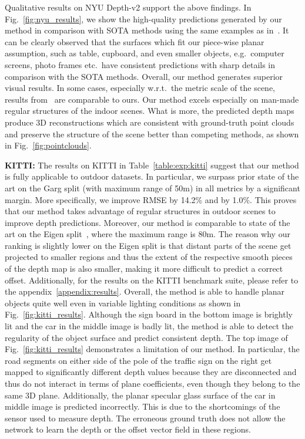\documentclass[final]{cvpr}
\begin{document}
Qualitative results on NYU Depth-v2 support the above findings. In Fig.~\ref{fig:nyu_results}, we show the high-quality predictions generated by our method in comparison with SOTA methods using the same examples as in~\cite{virtual:normal:depth}. It can be clearly observed that the surfaces which fit our piece-wise planar assumption, such as table, cupboard, and even smaller objects, e.g.\ computer screens, photo frames etc.\ have consistent predictions with sharp details in comparison with the SOTA methods. Overall, our method generates superior visual results. In some cases, especially w.r.t.\ the metric scale of the scene, results from~\cite{local:planar:guidance} are comparable to ours. Our method excels especially on man-made regular structures of the indoor scenes. What is more, the predicted depth maps produce 3D reconstructions which are consistent with ground-truth point clouds and preserve the structure of the scene better than competing methods, as shown in Fig.~\ref{fig:pointclouds}.

\textbf{KITTI:} The results on KITTI in Table~\ref{table:exp:kitti} suggest that our method is fully applicable to outdoor datasets. In particular, we surpass prior state of the art on the Garg split (with maximum range of 50m) in all metrics by a significant margin. More specifically, we improve RMSE by 14.2\% and  by 1.0\%. This proves that our method takes advantage of regular structures in outdoor scenes to improve depth predictions. Moreover, our method is comparable to state of the art on the Eigen split~\cite{depth:multiscale:network}, where the maximum range is 80m. The reason why our ranking is slightly lower on the Eigen split is that distant parts of the scene get projected to smaller regions and thus the extent of the respective smooth pieces of the depth map is also smaller, making it more difficult to predict a correct offset. Additionally, for the results on the KITTI benchmark suite, please refer to the appendix~\ref{appendix:results}. Overall, the method is able to handle planar objects quite well even in variable lighting conditions as shown in Fig.~\ref{fig:kitti_results}. Although the sign board in the bottom image is brightly lit and the car in the middle image is badly lit, the method is able to detect the regularity of the object surface and predict consistent depth. The top image of Fig.~\ref{fig:kitti_results} demonstrates a limitation of our method. In particular, the road segments on either side of the pole of the traffic sign on the right get mapped to significantly different depth values because they are disconnected and thus do not interact in terms of plane coefficients, even though they belong to the same 3D plane. Additionally, the planar specular glass surface of the car in middle image is predicted incorrectly. This is due to the shortcomings of the sensor used to measure depth. The erroneous ground truth does not allow the network to learn the depth or the offset vector field in these regions.
\end{document}
